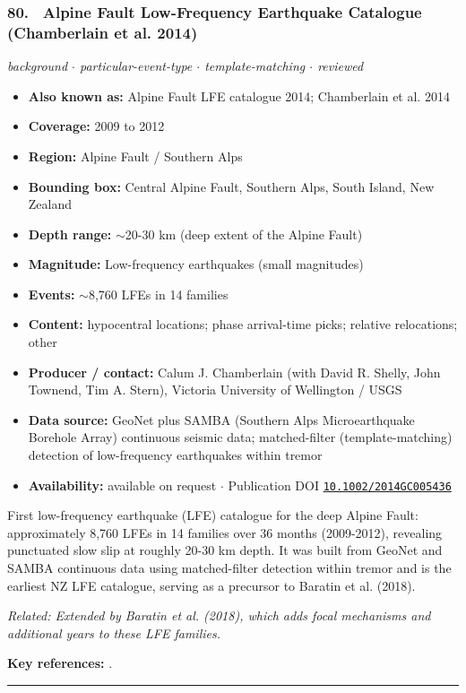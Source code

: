 \documentclass[10pt,a4paper]{article}
\newcommand{\catentryrule}{\par\vspace{3pt}\noindent\textcolor{rulegrey}{\rule{\linewidth}{0.3pt}}\par\vspace{5pt}}
\newcommand{\kv}[2]{\item \textbf{#1:} #2}
\begin{document}
\subsubsection*{\hypertarget{c:80}{80.}~ Alpine Fault Low-Frequency Earthquake Catalogue (Chamberlain et al. 2014)}
{\small\itshape background $\cdot$ particular-event-type $\cdot$ template-matching $\cdot$ reviewed}\par\vspace{2pt}
\begin{itemize}[leftmargin=1.3em,itemsep=0.6pt,topsep=1pt,parsep=0pt]
\kv{Also known as}{Alpine Fault LFE catalogue 2014; Chamberlain et al. 2014}
\kv{Coverage}{2009 to 2012}
\kv{Region}{Alpine Fault / Southern Alps}
\kv{Bounding box}{Central Alpine Fault, Southern Alps, South Island, New Zealand}
\kv{Depth range}{$\sim$20-30 km (deep extent of the Alpine Fault)}
\kv{Magnitude}{Low-frequency earthquakes (small magnitudes)}
\kv{Events}{$\sim$8,760 LFEs in 14 families}
\kv{Content}{hypocentral locations; phase arrival-time picks; relative relocations; other}
\kv{Producer / contact}{Calum J. Chamberlain (with David R. Shelly, John Townend, Tim A. Stern), Victoria University of Wellington / USGS}
\kv{Data source}{GeoNet plus SAMBA (Southern Alps Microearthquake Borehole Array) continuous seismic data; matched-filter (template-matching) detection of low-frequency earthquakes within tremor}
\kv{Availability}{available on request $\cdot$ Publication DOI \href{https://doi.org/10.1002/2014GC005436}{\nolinkurl{10.1002/2014GC005436}}}
\end{itemize}
\par\vspace{2pt}First low-frequency earthquake (LFE) catalogue for the deep Alpine Fault: approximately 8,760 LFEs in 14 families over 36 months (2009-2012), revealing punctuated slow slip at roughly 20-30 km depth. It was built from GeoNet and SAMBA continuous data using matched-filter detection within tremor and is the earliest NZ LFE catalogue, serving as a precursor to Baratin et al. (2018).
\par{\small\itshape Related: Extended by Baratin et al. (2018), which adds focal mechanisms and additional years to these LFE families.}
\par\vspace{2pt}\textbf{Key references:} \cite{Chamberlain2014}.
\catentryrule
\end{document}
